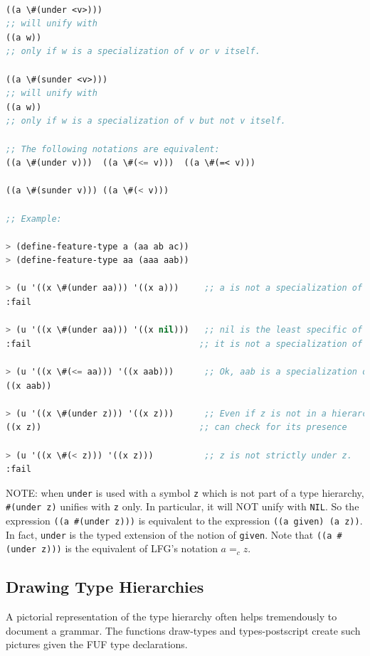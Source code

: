 \documentclass[10pt,a4paper]{report}
\begin{document}
\begin{lstlisting}[language=Lisp]

((a \#(under <v>)))  
;; will unify with 
((a w)) 
;; only if w is a specialization of v or v itself.  

((a \#(sunder <v>))) 
;; will unify with 
((a w)) 
;; only if w is a specialization of v but not v itself.

;; The following notations are equivalent:
((a \#(under v)))  ((a \#(<= v)))  ((a \#(=< v)))

((a \#(sunder v))) ((a \#(< v)))

;; Example:

> (define-feature-type a (aa ab ac))
> (define-feature-type aa (aaa aab))

> (u '((x \#(under aa))) '((x a)))     ;; a is not a specialization of aa
:fail                                  

> (u '((x \#(under aa))) '((x nil)))   ;; nil is the least specific of all 
:fail                                 ;; it is not a specialization of aa

> (u '((x \#(<= aa))) '((x aab)))      ;; Ok, aab is a specialization of aa
((x aab))

> (u '((x \#(under z))) '((x z)))      ;; Even if z is not in a hierarchy
((x z))                               ;; can check for its presence

> (u '((x \#(< z))) '((x z)))          ;; z is not strictly under z.
:fail
\end{lstlisting}

NOTE: when {\tt under} is used with a symbol {\tt z} which is not part of a type
hierarchy, {\tt \#(under z)} unifies with {\tt z} only.  In particular, it will
NOT unify with {\tt NIL}.  So the expression {\tt ((a \#(under z)))} is
equivalent to the expression {\tt ((a given) (a z))}.  In fact, {\tt under} is
the typed extension of the notion of {\tt given}.  
Note that {\tt ((a \#(under z)))} is the equivalent of LFG's notation 
$a =_c z$.


\subsection{Drawing Type Hierarchies}

A pictorial representation of the type hierarchy often helps tremendously
to document a grammar.  The functions draw-types and types-postscript
create such pictures given the FUF type declarations.
\end{document}
